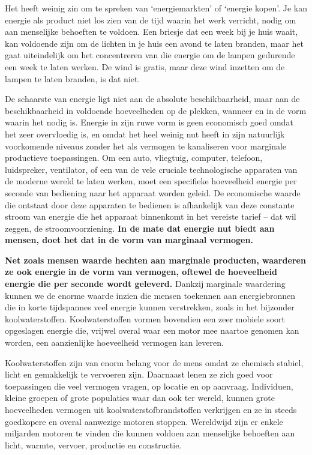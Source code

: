 \documentclass[
  a5paper,
  smalldemyvopaper,11pt,twoside,onecolumn,openright,extrafontsizes,
hidelinks]{memoir}
\begin{document}
Het heeft weinig zin om te spreken van `energiemarkten' of `energie
kopen'. Je kan energie als product niet los zien van de tijd waarin het
werk verricht, nodig om aan menselijke behoeften te voldoen. Een briesje
dat een week bij je huis waait, kan voldoende zijn om de lichten in je
huis een avond te laten branden, maar het gaat uiteindelijk om het
concentreren van die energie om de lampen gedurende een week te laten
werken. De wind is gratis, maar deze wind inzetten om de lampen te laten
branden, is dat niet.

De schaarste van energie ligt niet aan de absolute beschikbaarheid, maar
aan de beschikbaarheid in voldoende hoeveelheden op de plekken, wanneer
en in de vorm waarin het nodig is. Energie in zijn ruwe vorm is geen
economisch goed omdat het zeer overvloedig is, en omdat het heel weinig
nut heeft in zijn natuurlijk voorkomende niveaus zonder het als vermogen
te kanaliseren voor marginale productieve toepassingen. Om een auto,
vliegtuig, computer, telefoon, luidspreker, ventilator, of een van de
vele cruciale technologische apparaten van de moderne wereld te laten
werken, moet een specifieke hoeveelheid energie per seconde van
bediening naar het apparaat worden geleid. De economische waarde die
ontstaat door deze apparaten te bedienen is afhankelijk van deze
constante stroom van energie die het apparaat binnenkomt in het vereiste
tarief -- dat wil zeggen, de stroomvoorziening. \textbf{In de mate dat
energie nut biedt aan mensen, doet het dat in de vorm van marginaal
vermogen.}

\textbf{Net zoals mensen waarde hechten aan marginale producten,
waarderen ze ook energie in de vorm van vermogen, oftewel de hoeveelheid
energie die per seconde wordt geleverd.} Dankzij marginale waardering
kunnen we de enorme waarde inzien die mensen toekennen aan
energiebronnen die in korte tijdspannes veel energie kunnen verstrekken,
zoals in het bijzonder koolwaterstoffen. Koolwaterstoffen vormen
bovendien een zeer mobiele soort opgeslagen energie die, vrijwel overal
waar een motor mee naartoe genomen kan worden, een aanzienlijke
hoeveelheid vermogen kan leveren.

Koolwaterstoffen zijn van enorm belang voor de mens omdat ze chemisch
stabiel, licht en gemakkelijk te vervoeren zijn. Daarnaast lenen ze zich
goed voor toepassingen die veel vermogen vragen, op locatie en op
aanvraag. Individuen, kleine groepen of grote populaties waar dan ook
ter wereld, kunnen grote hoeveelheden vermogen uit
koolwaterstofbrandstoffen verkrijgen en ze in steeds goedkopere en
overal aanwezige motoren stoppen. Wereldwijd zijn er enkele miljarden
motoren te vinden die kunnen voldoen aan menselijke behoeften aan licht,
warmte, vervoer, productie en constructie.
\end{document}
